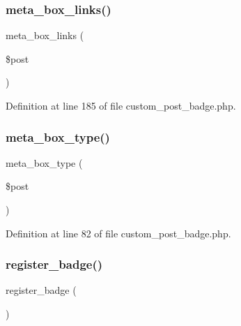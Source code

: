 \subsubsection{\texorpdfstring{meta\+\_\+box\+\_\+links()}{meta\_box\_links()}}
{\footnotesize\ttfamily meta\+\_\+box\+\_\+links (\begin{DoxyParamCaption}\item[{}]{\$post }\end{DoxyParamCaption})}



Definition at line 185 of file custom\+\_\+post\+\_\+badge.\+php.

\mbox{\label{custom__post__badge_8php_a9c0574de1d784cf81ca5f0d41a0d2b0e}} 
\subsubsection{\texorpdfstring{meta\+\_\+box\+\_\+type()}{meta\_box\_type()}}
{\footnotesize\ttfamily meta\+\_\+box\+\_\+type (\begin{DoxyParamCaption}\item[{}]{\$post }\end{DoxyParamCaption})}



Definition at line 82 of file custom\+\_\+post\+\_\+badge.\+php.

\mbox{\label{custom__post__badge_8php_a33deba5b6a1388aa48d025aa34ec563b}} 
\subsubsection{\texorpdfstring{register\+\_\+badge()}{register\_badge()}}
{\footnotesize\ttfamily register\+\_\+badge (\begin{DoxyParamCaption}{ }\end{DoxyParamCaption})}



